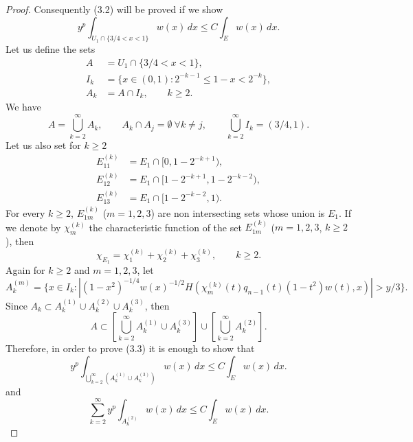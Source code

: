 \documentclass[10pt,a4paper]{article}
\theoremstyle{plain}
\theoremstyle{remark}
\begin{document}
\begin{proof}
Consequently (3.2) will be proved if we show
\begin{equation}
y^{p} \int_{U_{1} \cap \{3/4 < x < 1\}} w(x)\,dx
\leq C \int_{E} w(x)\,dx.
\tag{3.3}
\end{equation}
Let us define the sets
\begin{align*}
A &= U_{1} \cap \{3/4 < x < 1\},\\
I_{k} &= \{x \in (0,1) : 2^{-k-1} \leq 1-x < 2^{-k}\}, \\
A_{k} &= A \cap I_{k},\qquad k \geq 2.
\end{align*}
We have
$$
A = \bigcup_{k=2}^{\infty} A_{k},\qquad
A_{k} \cap A_{j} = \emptyset \ \forall k \neq j, \qquad
\bigcup_{k=2}^{\infty} I_{k} = (3/4,1).
$$
Let us also set for $k \geq 2$
\begin{align*}
E_{11}^{(k)} &= E_{1} \cap [0,1-2^{-k+1}), \\
E_{12}^{(k)} &= E_{1} \cap [1-2^{-k+1},1-2^{-k-2}), \\
E_{13}^{(k)} &= E_{1} \cap [1-2^{-k-2},1).
\end{align*}
For every $k \geq 2$, $E_{1m}^{(k)}$ ($m = 1,2,3$) are non intersecting
sets whose union is $E_{1}$. If we denote by $\chi_{m}^{(k)}$
the characteristic function of the set
$E_{1m}^{(k)}$ ($m = 1,2,3$, $k \geq 2$), then
$$
\chi_{E_{1}} = \chi_{1}^{(k)} + \chi_{2}^{(k)}
+ \chi_{3}^{(k)},\qquad k \geq 2.
$$
Again for $k \geq 2$ and $m = 1,2,3$, let
$$
A_{k}^{(m)} = \{ x \in I_{k} : |(1-x^{2})^{-1/4} w(x)^{-1/2}
H(\chi_{m}^{(k)}(t)q_{n-1}(t)(1-t^{2})w(t),x)|  > y/3 \}.
$$
Since $A_{k} \subset A_{k}^{(1)} \cup A_{k}^{(2)} \cup A_{k}^{(3)}$, then
$$
A \subset \left[ \bigcup_{k=2}^{\infty} A_{k}^{(1)} \cup A_{k}^{(3)} \right]
\cup \left[ \bigcup_{k=2}^{\infty} A_{k}^{(2)} \right].
$$
Therefore, in order to prove (3.3) it is enough to show that
\begin{equation}
y^{p} \int_{\bigcup_{k=2}^{\infty} (A_{k}^{(1)} \cup A_{k}^{(3)})} w(x)\,dx
\leq C \int_{E} w(x)\,dx.
\tag{3.4}
\end{equation}
and
\begin{equation}
\sum_{k=2}^{\infty} y^{p} \int_{A_{k}^{(2)}} w(x)\,dx
\leq C \int_{E} w(x)\,dx.
\tag{3.5}
\end{equation}


\end{proof}
\end{document}
